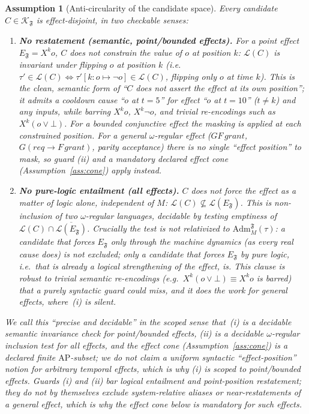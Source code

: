 \documentclass[11pt]{article}
\newtheorem{assumption}{Assumption}
\theoremstyle{remark}
\newcommand{\Lang}{\mathcal{L}}
\newcommand{\Frame}{\mathfrak{F}}
\newcommand{\Adm}{\mathrm{Adm}}
\begin{document}
\begin{assumption}[Anti-circularity of the candidate space]
\label{ass:anticirc}
Every candidate \(C\in\mathcal{K}_{\Frame}\) is \emph{effect-disjoint}, in two
checkable senses:
\begin{enumerate}[label=(\roman*)]
  \item \textbf{No restatement (semantic, point/bounded effects).} For a point
        effect \(E_{\Frame}=X^k o\), \(C\) does not constrain the value of \(o\) at
        position \(k\): \(\Lang(C)\) is invariant under flipping \(o\) at position
        \(k\) (i.e.\ \(\tau'\in\Lang(C)\iff\tau'[k{:}o{\mapsto}\neg o]\in\Lang(C)\),
        flipping only \(o\) at time \(k\)). This is the clean, semantic form of
        ``\(C\) does not assert the effect at its own position''; it admits a
        cooldown cause ``\(o\) at \(t=5\)'' for effect ``\(o\) at \(t=10\)''
        (\(t\neq k\)) and any inputs, while barring \(X^k o\), \(X^k\neg o\), and
        trivial re-encodings such as \(X^k(o\lor\bot)\). For a bounded conjunctive
        effect the masking is applied at each constrained position. \emph{For a
        general \(\omega\)-regular effect} (\(GF\,grant\), \(G(req\to F\,grant)\),
        parity acceptance) there is no single ``effect position'' to mask, so guard
        (ii) and a \emph{mandatory} declared effect cone
        (Assumption~\ref{ass:cone}) apply instead.
  \item \textbf{No pure-logic entailment (all effects).} \(C\) does not force the
        effect as a matter of logic \emph{alone}, independent of \(M\):
        \(\Lang(C)\not\subseteq\Lang(E_{\Frame})\). This is non-inclusion of two
        \(\omega\)-regular languages, decidable by testing emptiness of
        \(\Lang(C)\cap\overline{\Lang(E_{\Frame})}\). Crucially the test is
        \emph{not} relativized to \(\Adm_M^{\Frame}(\tau)\): a candidate that
        forces \(E_{\Frame}\) only \emph{through the machine dynamics} (as every
        real cause does) is \emph{not} excluded; only a candidate that forces
        \(E_{\Frame}\) by pure logic, i.e.\ that is already a logical strengthening
        of the effect, is. This clause is robust to trivial semantic re-encodings
        (e.g.\ \(X^k(o\lor\bot)\equiv X^k o\) is barred) that a purely syntactic
        guard could miss, and it does the work for general effects, where~(i) is
        silent.
\end{enumerate}
We call this ``precise and decidable'' in the scoped sense that~(i) is a decidable
semantic invariance check for point/bounded effects, (ii) is a decidable
\(\omega\)-regular inclusion test for all effects, and the effect cone
(Assumption~\ref{ass:cone}) is a declared finite \(\mathrm{AP}\)-subset; we do
\emph{not} claim a uniform syntactic ``effect-position'' notion for arbitrary
temporal effects, which is why (i) is scoped to point/bounded effects. Guards (i)
and (ii) bar \emph{logical entailment} and \emph{point-position restatement}; they
do not by themselves exclude system-relative aliases or near-restatements of a
general effect, which is why the effect cone below is mandatory for such effects.
\end{assumption}
\end{document}
